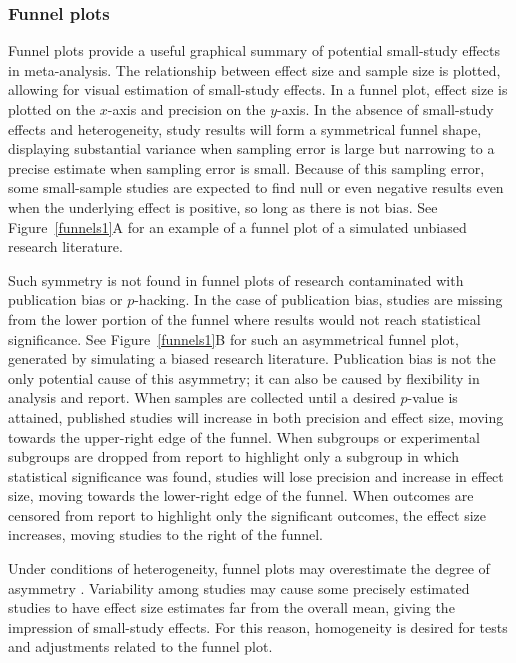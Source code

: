 \documentclass[man, mask]{apa6}
\begin{document}
\subsubsection{Funnel plots}
Funnel plots provide a useful graphical summary of potential small-study effects in meta-analysis.  The relationship between effect size and sample size is plotted, allowing for visual estimation of small-study effects. In a funnel plot, effect size is plotted on the $x$-axis and precision on the $y$-axis. In the absence of small-study effects and heterogeneity, study results will form a symmetrical funnel shape, displaying substantial variance when sampling error is large but narrowing to a precise estimate when sampling error is small. Because of this sampling error, some small-sample studies are expected to find null or even negative results even when the underlying effect is positive, so long as there is not bias. See Figure~\ref{funnels1}A for an example of a funnel plot of a simulated unbiased research literature.

Such symmetry is not found in funnel plots of research contaminated with publication bias or $p$-hacking.  In the case of publication bias, studies are missing from the lower portion of the funnel where results would not reach statistical significance. See Figure~\ref{funnels1}B for such an asymmetrical funnel plot, generated by simulating a biased research literature. Publication bias is not the only potential cause of this asymmetry; it can also be caused by flexibility in analysis and report. When samples are collected until a desired $p$-value is attained, published studies will increase in both precision and effect size, moving towards the upper-right edge of the funnel. When subgroups or experimental subgroups are dropped from report to highlight only a subgroup in which statistical significance was found, studies will lose precision and increase in effect size, moving towards the lower-right edge of the funnel. When outcomes are censored from report to highlight only the significant outcomes, the effect size increases, moving studies to the right of the funnel. 

Under conditions of heterogeneity, funnel plots may overestimate the degree of asymmetry \citep{Terrin:etal:2003}. Variability among studies may cause some precisely estimated studies to have effect size estimates far from the overall mean, giving the impression of small-study effects. For this reason, homogeneity is desired for tests and adjustments related to the funnel plot.
\end{document}
